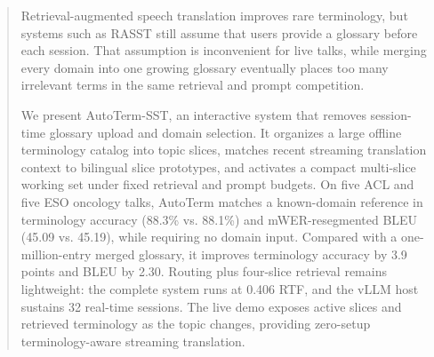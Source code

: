 \begin{abstract}
Retrieval-augmented speech translation improves rare terminology, but systems
such as RASST still assume that users provide a glossary before each session.
That assumption is inconvenient for live talks, while merging every domain into
one growing glossary eventually places too many irrelevant terms in the same
retrieval and prompt competition.

We present AutoTerm-SST, an interactive system that removes session-time
glossary upload and domain selection. It organizes a large offline terminology
catalog into topic slices, matches recent streaming translation context to
bilingual slice prototypes, and activates a compact multi-slice working set
under fixed retrieval and prompt budgets. On five ACL and five ESO oncology talks,
AutoTerm matches a known-domain reference in terminology accuracy
(88.3\% vs. 88.1\%) and mWER-resegmented BLEU (45.09 vs. 45.19), while requiring no
domain input. Compared with a one-million-entry merged glossary, it improves
terminology accuracy by 3.9 points and BLEU by 2.30. Routing plus four-slice
retrieval remains lightweight: the complete system runs at 0.406 RTF, and the
vLLM host sustains 32 real-time sessions. The live demo exposes active slices
and retrieved terminology as the topic changes, providing zero-setup
terminology-aware streaming translation.
\end{abstract}
